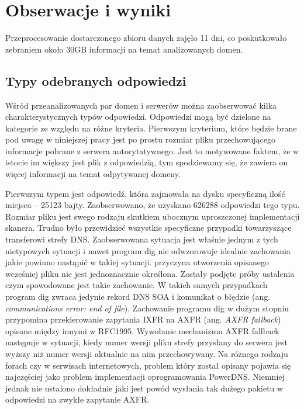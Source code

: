 \chapter{Obserwacje i wyniki}
Przeprocesowanie dostarczonego zbioru danych zajęło 11 dni, co poskutkowało zebraniem około 30GB informacji na temat analizowanych domen.

\section{Typy odebranych odpowiedzi}
Wśród przeanalizowanych par domen i serwerów można zaobserwować kilka charakterystycznych typów odpowiedzi. Odpowiedzi mogą być dzielone na kategorie ze względu na różne kryteria. Pierwszym kryterium, które będzie brane pod uwagę w niniejszej pracy jest po prostu rozmiar pliku przechowującego informacje pobrane z serwera autorytatywnego. Jest to motywowane faktem, że w istocie im większy jest plik z odpowiedzią, tym spodziewamy się, że zawiera on więcej informacji na temat odpytywanej domeny. 

Pierwszym typem jest odpowiedź, która zajmowała na dysku specyficzną ilość miejsca -- 25123 bajty. Zaobserwowano, że uzyskano 626288 odpowiedzi tego typu. Rozmiar pliku jest swego rodzaju skutkiem ubocznym uproszczonej implementacji skanera. Trudno było przewidzieć wszystkie specyficzne przypadki towarzyszące transferowi strefy DNS. Zaobserwowana sytuacja jest właśnie jednym z tych nietypowych sytuacji i nawet program dig nie odwzorowuje idealnie zachowania jakie powinno nastąpić w takiej sytuacji. przyczyna utworzenia opisanego wcześniej pliku nie jest jednoznacznie określona. Zostały podjęte próby ustalenia czym spowodowane jest takie zachowanie. W takich samych przypadkach program dig zwraca jedynie rekord DNS SOA i komunikat o błędzie (ang. \textit{communications error: end of file}). Zachowanie programu dig w dużym stopniu przypomina przekierowanie zapytania IXFR na AXFR (ang. \textit{AXFR fallback}) opisane między innymi w RFC1995\cite{RFC1995}. Wywołanie mechanizmu AXFR fallback następuje w sytuacji, kiedy numer wersji pliku strefy przysłany do serwera jest wyższy niż numer wersji aktualnie na nim przechowywany. Na różnego rodzaju forach\cite{powerdns-forum} czy w serwisach internetowych\cite{powerdns-git}, problem który został opisany pojawia się najczęściej jako problem implementacji oprogramowania PowerDNS\cite{powerdns}. Niemniej jednak nie ustalono dokładnie jaki jest powód wysłania tak dużego pakietu w odpowiedzi na zwykłe zapytanie AXFR.


